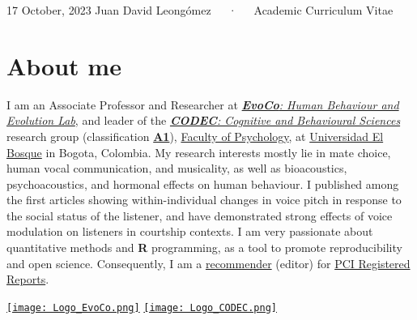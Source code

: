 \documentclass[11pt,a4paper,]{awesome-cv}
\begin{document}
\makecvheader

\makecvfooter
  {17 October, 2023}
    {Juan David Leongómez~~~·~~~Academic Curriculum Vitae}
  {\thepage}





\hypertarget{about-me}{%
\section{About me}\label{about-me}}

\begin{minipage}[c]{0.85\linewidth}
I am an Associate Professor and Researcher at \href{https://jdleongomez.info/en/team/}{\textit{\textbf{EvoCo}: Human Behaviour and Evolution Lab}}, and leader of the \href{https://investigaciones.unbosque.edu.co/codec}{\textit{\textbf{CODEC}: Cognitive and Behavioural Sciences}} research group (classification \href{https://scienti.minciencias.gov.co/gruplac/jsp/visualiza/visualizagr.jsp?nro=00000000001446}{\textbf{A1}}), \href{https://www.uelbosque.edu.co/psicologia}{Faculty of Psychology}, at \href{https://www.uelbosque.edu.co/}{Universidad El Bosque} in Bogota, Colombia. My research interests mostly lie in mate choice, human vocal communication, and musicality, as well as bioacoustics, psychoacoustics, and hormonal effects on human behaviour. I published among the first articles showing within-individual changes in voice pitch in response to the social status of the listener, and have demonstrated strong effects of voice modulation on listeners in courtship contexts. I am very passionate about quantitative methods and \textbf{R} programming, as a tool to promote reproducibility and open science. Consequently, I am a \href{https://rr.peercommunityin.org/about/recommenders}{recommender} (editor) for \href{https://rr.peercommunityin.org/}{PCI Registered Reports}.
\end{minipage} \begin{minipage}[c]{0.15\linewidth}
\begin{flushright} 
\hfill \href{https://jdleongomez.info/en/team/}{\texttt{[image: Logo\_EvoCo.png]}} \newline \href{https://investigaciones.unbosque.edu.co/codec}{\texttt{[image: Logo\_CODEC.png]}}
\end{flushright}
\end{minipage}
\end{document}
